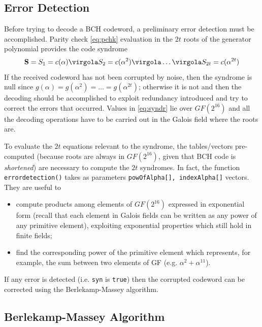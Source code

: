 \subsection{Error Detection}
Before trying to decode a BCH codeword, a preliminary error detection must be accomplished. Parity check \eqref{eq:pchk} evaluation in the \(2t\) roots of the generator polynomial provides the code syndrome
\begin{equation} \label{eq:syndr}
\vet S = S_1 = c(\alpha) \virgola S_2 = c(\alpha^2) \virgola \ldots \virgola S_{2t} = c(\alpha^{2t})
\end{equation}
If the received codeword has not been corrupted by noise, then the syndrome is null since \(g(\alpha) = g(\alpha^2) = \ldots = g(\alpha^{2t})\); otherwise it is not and then the decoding should be accomplished to exploit redundancy introduced and try to correct the errors that occurred. Values in \eqref{eq:syndr} lie over \(GF(2^{16})\) and all the decoding operations have to be carried out in the Galois field where the roots are.



To evaluate the \(2t\) equations relevant to the syndrome, the tables/vectors pre-computed (because roots are always in \(GF(2^{16})\), given that BCH code is \emph{shortened}) are necessary to compute the \(2t\) syndromes. In fact, the function \texttt{errordetection()} takes as parameters \texttt{powOfAlpha[], indexAlpha[]} vectors. They are useful to
\begin{itemize}
\item compute products among elements of \(GF(2^{16}) \) expressed in exponential form (recall that each element in Galois fields can be written as any power of any primitive element), exploiting exponential properties which still hold in finite fields;
\item find the corresponding power of the primitive element which represents, for example, the sum between two elements of GF (e.g. \( \alpha^2 + \alpha^{11}\)).
\end{itemize}

If any error is detected (i.e. \texttt{syn} is \texttt{true}) then the corrupted codeword can be corrected using the Berlekamp-Massey algorithm.

\subsection{Berlekamp-Massey Algorithm}

